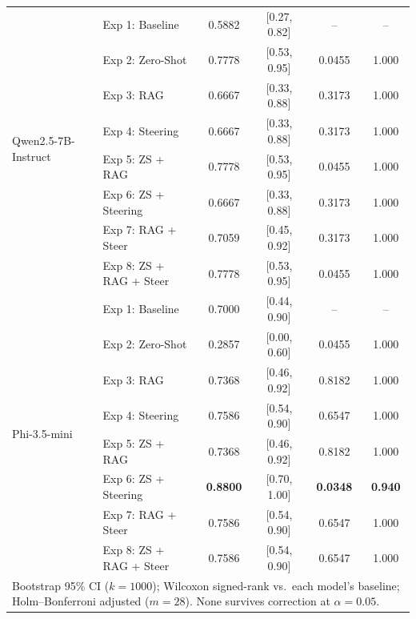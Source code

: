 \documentclass{ieeeaccess}
\begin{document}
\begin{table}[htbp]
{\begin{tabular}{llcccc}
\hline

\multirow{8}{*}{Qwen2.5-7B-Instruct}
& Exp 1: Baseline       & 0.5882 & [0.27, 0.82] & --     & -- \\
& Exp 2: Zero-Shot      & 0.7778 & [0.53, 0.95] & 0.0455 & 1.000 \\
& Exp 3: RAG            & 0.6667 & [0.33, 0.88] & 0.3173 & 1.000 \\
& Exp 4: Steering       & 0.6667 & [0.33, 0.88] & 0.3173 & 1.000 \\
& Exp 5: ZS + RAG       & 0.7778 & [0.53, 0.95] & 0.0455 & 1.000 \\
& Exp 6: ZS + Steering  & 0.6667 & [0.33, 0.88] & 0.3173 & 1.000 \\
& Exp 7: RAG + Steer    & 0.7059 & [0.45, 0.92] & 0.3173 & 1.000 \\
& Exp 8: ZS + RAG + Steer & 0.7778 & [0.53, 0.95] & 0.0455 & 1.000 \\

\hline

\multirow{8}{*}{Phi-3.5-mini}
& Exp 1: Baseline       & 0.7000 & [0.44, 0.90] & --     & -- \\
& Exp 2: Zero-Shot      & 0.2857 & [0.00, 0.60] & 0.0455 & 1.000 \\
& Exp 3: RAG            & 0.7368 & [0.46, 0.92] & 0.8182 & 1.000 \\
& Exp 4: Steering       & 0.7586 & [0.54, 0.90] & 0.6547 & 1.000 \\
& Exp 5: ZS + RAG       & 0.7368 & [0.46, 0.92] & 0.8182 & 1.000 \\
& Exp 6: ZS + Steering  & \textbf{0.8800} & [0.70, 1.00] & \textbf{0.0348} & \textbf{0.940} \\
& Exp 7: RAG + Steer    & 0.7586 & [0.54, 0.90] & 0.6547 & 1.000 \\
& Exp 8: ZS + RAG + Steer & 0.7586 & [0.54, 0.90] & 0.6547 & 1.000 \\

\hline
\multicolumn{6}{l}{\footnotesize Bootstrap 95\% CI ($k=1000$); Wilcoxon signed-rank vs.\ each model's baseline; Holm--Bonferroni adjusted ($m=28$). None survives correction at $\alpha=0.05$.} \\
\end{tabular}
}
\end{table}
\end{document}
